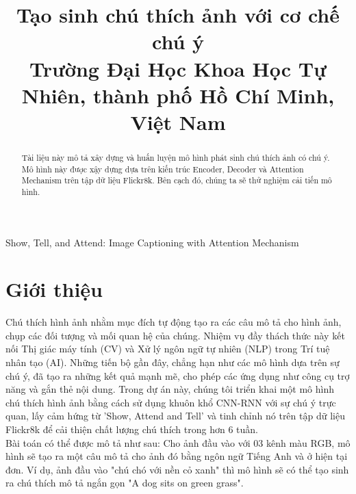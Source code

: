 \documentclass[conference]{IEEEtran}
\begin{document}
\title{Tạo sinh chú thích ảnh với cơ chế chú ý\\
{\footnotesize Trường Đại Học Khoa Học Tự Nhiên, thành phố Hồ Chí Minh, Việt Nam\\}
}

\author{
\and
{}
}

\maketitle

\begin{abstract}
Tài liệu này mô tả xây dựng và huấn luyện mô hình phát sinh chú thích ảnh có chú ý. Mô hình này được xậy dựng dựa trên kiến trúc Encoder, Decoder và Attention Mechanism trên tập dữ liệu Flickr8k. Bên cạch đó, chúng ta sẽ thử nghiệm cải tiến mô hình.
\end{abstract}

\begin{IEEEkeywords}
Show, Tell, and Attend: Image Captioning with Attention Mechanism
\end{IEEEkeywords}

\section{Giới thiệu}
Chú thích hình ảnh nhằm mục đích tự động tạo ra các câu mô tả cho hình ảnh, chụp các đối tượng và mối quan hệ của chúng. Nhiệm vụ đầy thách thức này kết nối Thị giác máy tính (CV) và Xử lý ngôn ngữ tự nhiên (NLP) trong Trí tuệ nhân tạo (AI).
Những tiến bộ gần đây, chẳng hạn như các mô hình dựa trên sự chú ý, đã tạo ra những kết quả mạnh mẽ, cho phép các ứng dụng như công cụ trợ năng và gắn thẻ nội dung. Trong dự án này, chúng tôi triển khai một mô hình chú thích hình ảnh bằng cách sử dụng khuôn khổ CNN-RNN với sự chú ý trực quan, lấy cảm hứng từ 'Show, Attend and Tell' và tinh chỉnh nó trên tập dữ liệu Flickr8k để cải thiện chất lượng chú thích trong hơn 6 tuần.\\
Bài toán có thể được mô tả như sau: Cho ảnh đầu vào với 03 kênh màu RGB, mô hình sẽ tạo ra một câu mô tả cho ảnh đó bằng ngôn ngữ Tiếng Anh và ở hiện tại đơn. Ví dụ, ảnh đầu vào "chú chó với nền cỏ xanh" thì mô hình sẽ có thể tạo sinh ra chú thích mô tả ngắn gọn "A dog sits on green grass".\\
\end{document}
